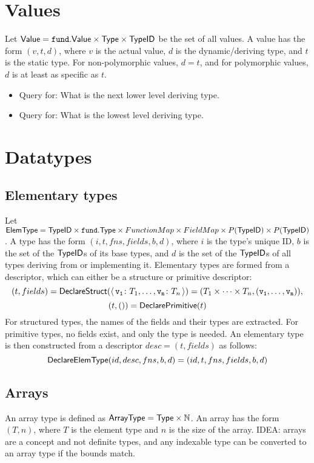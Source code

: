 \section{Values}
Let $\mathsf{Value} = \mathtt{fund.}\mathsf{Value} \times \mathsf{Type} \times \mathsf{TypeID}$ be the set of all values.
A value has the form $(v, t, d)$, where $v$ is the actual value, $d$ is the dynamic/deriving type, and $t$ is the static type.
For non-polymorphic values, $d=t$, and for polymorphic values, $d$ is at least as specific as $t$.
\begin{itemize}
	\item Query for: What is the next lower level deriving type.
	\item Query for: What is the lowest level deriving type.
\end{itemize}

\section{Datatypes}

\subsection{Elementary types}
Let $\mathsf{ElemType} = \mathsf{TypeID} \times \mathtt{fund.}\mathsf{Type} \times FunctionMap \times FieldMap \times P(\mathsf{TypeID}) \times P(\mathsf{TypeID})$.
A type has the form $(i, t, fns, fields, b, d)$, where $i$ is the type's unique ID, $b$ is the set of the $\mathsf{TypeID}$s of its base types, and $d$ is the set of the $\mathsf{TypeID}$s of all types deriving from or implementing it.
Elementary types are formed from a descriptor, which can either be a structure or primitive descriptor:
$$
	(t, fields) = \DeclareStruct(\struct{\var{v_1}{T_1}, \dots, \var{v_n}{T_n}}) = (T_1 \times \dots \times T_n, (\cn{v_1}, \dots, \cn{v_n})),
$$
$$
	(t, ()) = \mathsf{DeclarePrimitive}(t)
$$
For structured types, the names of the fields and their types are extracted.
For primitive types, no fields exist, and only the type is needed.
An elementary type is then constructed from a descriptor $desc = (t, fields)$ as follows:
$$
	\mathsf{DeclareElemType}(id, desc, fns, b, d) = (id, t, fns, fields, b, d)
$$

\subsection{Arrays}
An array type is defined as $\mathsf{ArrayType} = \mathsf{Type} \times \mathbb{N}$.
An array has the form $(T, n)$, where $T$ is the element type and $n$ is the size of the array.
IDEA: arrays are a concept and not definite types, and any indexable type can be converted to an array type if the bounds match.

